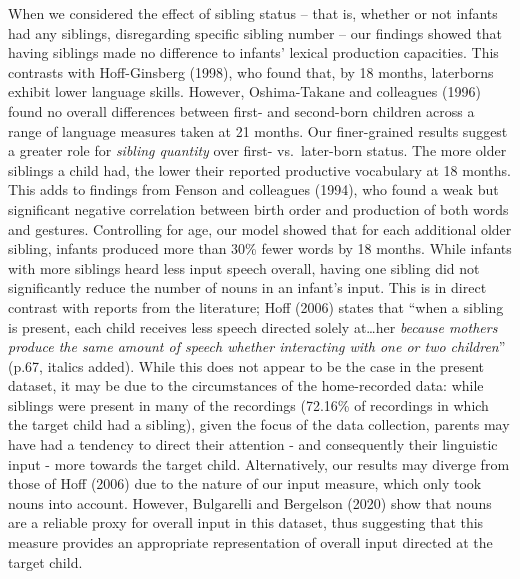 \documentclass[
  english,
  man,floatsintext]{apa6}
\begin{document}
When we considered the effect of sibling status -- that is, whether or not infants had any siblings, disregarding specific sibling number -- our findings showed that having siblings made no difference to infants' lexical production capacities. This contrasts with Hoff-Ginsberg (1998), who found that, by 18 months, laterborns exhibit lower language skills. However, Oshima-Takane and colleagues (1996) found no overall differences between first- and second-born children across a range of language measures taken at 21 months. Our finer-grained results suggest a greater role for \emph{sibling quantity} over first- vs.~later-born status. The more older siblings a child had, the lower their reported productive vocabulary at 18 months. This adds to findings from Fenson and colleagues (1994), who found a weak but significant negative correlation between birth order and production of both words and gestures. Controlling for age, our model showed that for each additional older sibling, infants produced more than 30\% fewer words by 18 months.
While infants with more siblings heard less input speech overall, having one sibling did not significantly reduce the number of nouns in an infant's input. This is in direct contrast with reports from the literature; Hoff (2006) states that \enquote{when a sibling is present, each child receives less speech directed solely at\ldots her \emph{because mothers produce the same amount of speech whether interacting with one or two children}} (p.67, italics added). While this does not appear to be the case in the present dataset, it may be due to the circumstances of the home-recorded data: while siblings were present in many of the recordings (72.16\% of recordings in which the target child had a sibling), given the focus of the data collection, parents may have had a tendency to direct their attention - and consequently their linguistic input - more towards the target child. Alternatively, our results may diverge from those of Hoff (2006) due to the nature of our input measure, which only took nouns into account. However, Bulgarelli and Bergelson (2020) show that nouns are a reliable proxy for overall input in this dataset, thus suggesting that this measure provides an appropriate representation of overall input directed at the target child.
\end{document}
